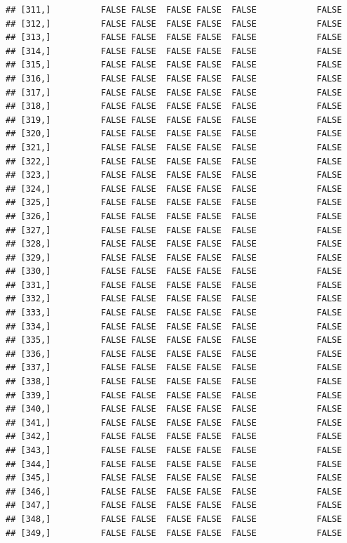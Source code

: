 \documentclass[
  english,
  man,floatsintext]{apa6}
\begin{document}
\begin{verbatim}
## [311,]          FALSE FALSE  FALSE FALSE  FALSE            FALSE
## [312,]          FALSE FALSE  FALSE FALSE  FALSE            FALSE
## [313,]          FALSE FALSE  FALSE FALSE  FALSE            FALSE
## [314,]          FALSE FALSE  FALSE FALSE  FALSE            FALSE
## [315,]          FALSE FALSE  FALSE FALSE  FALSE            FALSE
## [316,]          FALSE FALSE  FALSE FALSE  FALSE            FALSE
## [317,]          FALSE FALSE  FALSE FALSE  FALSE            FALSE
## [318,]          FALSE FALSE  FALSE FALSE  FALSE            FALSE
## [319,]          FALSE FALSE  FALSE FALSE  FALSE            FALSE
## [320,]          FALSE FALSE  FALSE FALSE  FALSE            FALSE
## [321,]          FALSE FALSE  FALSE FALSE  FALSE            FALSE
## [322,]          FALSE FALSE  FALSE FALSE  FALSE            FALSE
## [323,]          FALSE FALSE  FALSE FALSE  FALSE            FALSE
## [324,]          FALSE FALSE  FALSE FALSE  FALSE            FALSE
## [325,]          FALSE FALSE  FALSE FALSE  FALSE            FALSE
## [326,]          FALSE FALSE  FALSE FALSE  FALSE            FALSE
## [327,]          FALSE FALSE  FALSE FALSE  FALSE            FALSE
## [328,]          FALSE FALSE  FALSE FALSE  FALSE            FALSE
## [329,]          FALSE FALSE  FALSE FALSE  FALSE            FALSE
## [330,]          FALSE FALSE  FALSE FALSE  FALSE            FALSE
## [331,]          FALSE FALSE  FALSE FALSE  FALSE            FALSE
## [332,]          FALSE FALSE  FALSE FALSE  FALSE            FALSE
## [333,]          FALSE FALSE  FALSE FALSE  FALSE            FALSE
## [334,]          FALSE FALSE  FALSE FALSE  FALSE            FALSE
## [335,]          FALSE FALSE  FALSE FALSE  FALSE            FALSE
## [336,]          FALSE FALSE  FALSE FALSE  FALSE            FALSE
## [337,]          FALSE FALSE  FALSE FALSE  FALSE            FALSE
## [338,]          FALSE FALSE  FALSE FALSE  FALSE            FALSE
## [339,]          FALSE FALSE  FALSE FALSE  FALSE            FALSE
## [340,]          FALSE FALSE  FALSE FALSE  FALSE            FALSE
## [341,]          FALSE FALSE  FALSE FALSE  FALSE            FALSE
## [342,]          FALSE FALSE  FALSE FALSE  FALSE            FALSE
## [343,]          FALSE FALSE  FALSE FALSE  FALSE            FALSE
## [344,]          FALSE FALSE  FALSE FALSE  FALSE            FALSE
## [345,]          FALSE FALSE  FALSE FALSE  FALSE            FALSE
## [346,]          FALSE FALSE  FALSE FALSE  FALSE            FALSE
## [347,]          FALSE FALSE  FALSE FALSE  FALSE            FALSE
## [348,]          FALSE FALSE  FALSE FALSE  FALSE            FALSE
## [349,]          FALSE FALSE  FALSE FALSE  FALSE            FALSE

\end{verbatim}
\end{document}
